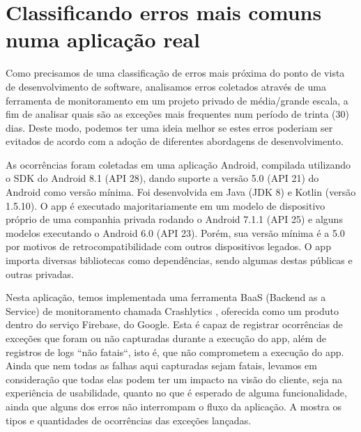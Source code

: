 \chapter{Classificando erros mais comuns numa aplicação real}\label{cap:classification_on_real_world_app}

Como precisamos de uma classificação de erros mais próxima do ponto de vista de desenvolvimento de software, analisamos erros coletados através de uma ferramenta de monitoramento em um projeto privado de média/grande escala, a fim de analisar quais são as exceções mais frequentes num período de trinta (30) dias. Deste modo, podemos ter uma ideia melhor se estes erros poderiam ser evitados de acordo com a adoção de diferentes abordagens de desenvolvimento.

As ocorrências foram coletadas em uma aplicação Android, compilada utilizando o SDK do Android 8.1 (API 28), dando suporte a versão 5.0 (API 21) do Android como versão mínima. Foi desenvolvida em Java (JDK 8) e Kotlin (versão 1.5.10). O app é executado majoritariamente em um modelo de dispositivo próprio de uma companhia privada rodando o Android 7.1.1 (API 25) e alguns modelos executando o Android 6.0 (API 23). Porém, sua versão mínima é a 5.0 por motivos de retrocompatibilidade com outros dispositivos legados. O app importa diversas bibliotecas como dependências, sendo algumas destas públicas e outras privadas.

Nesta aplicação, temos implementada uma ferramenta BaaS (Backend as a Service) \cite{okta_backend_as_a_service} de monitoramento chamada Crashlytics \cite{crashlytics_home}, oferecida como um produto dentro do serviço Firebase, do Google. Esta é capaz de registrar ocorrências de exceções que foram ou não capturadas durante a execução do app, além de registros de logs ``não fatais``, isto é, que não comprometem a execução do app. Ainda que nem todas as falhas aqui capturadas sejam fatais, levamos em consideração que todas elas podem ter um impacto na visão do cliente, seja na experiência de usabilidade, quanto no que é esperado de alguma funcionalidade, ainda que alguns dos erros não interrompam o fluxo da aplicação. A  mostra os tipos e quantidades de ocorrências das exceções lançadas.

